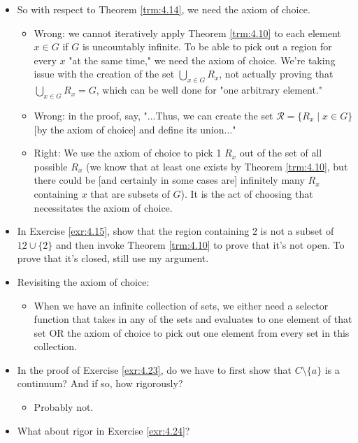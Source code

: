 \documentclass[titlepage]{report}
\begin{document}
\begin{itemize}
\begin{itemize}
    \end{itemize}
    \item So with respect to Theorem \ref{trm:4.14}, we need the axiom of choice.
    \begin{itemize}
        \item Wrong: we cannot iteratively apply Theorem \ref{trm:4.10} to each element $x\in G$ if $G$ is uncountably infinite. To be able to pick out a region for every $x$ "at the same time," we need the axiom of choice. We're taking issue with the creation of the set $\bigcup_{x\in G}R_x$, not actually proving that $\bigcup_{x\in G}R_x=G$, which can be well done for "one arbitrary element."
        \item Wrong: in the proof, say, "...Thus, we can create the set $\mathcal{R}=\{R_x\mid x\in G\}$ [by the axiom of choice] and define its union..."
        \item Right: We use the axiom of choice to pick 1 $R_x$ out of the set of all possible $R_x$ (we know that at least one exists by Theorem \ref{trm:4.10}, but there could be [and certainly in some cases are] infinitely many $R_x$ containing $x$ that are subsets of $G$). It is the act of choosing that necessitates the axiom of choice.
    \end{itemize}
    \item In Exercise \ref{exr:4.15}, show that the region containing 2 is not a subset of $\underline{12}\cup\{2\}$ and then invoke Theorem \ref{trm:4.10} to prove that it's not open. To prove that it's closed, still use my argument.
    \item {}Revisiting the axiom of choice:
    \begin{itemize}
        \item When we have an infinite collection of sets, we either need a selector function that takes in any of the sets and evaluates to one element of that set OR the axiom of choice to pick out one element from every set in this collection.
    \end{itemize}
    \item {}In the proof of Exercise \ref{exr:4.23}, do we have to first show that $C\setminus\{a\}$ is a continuum? And if so, how rigorously?
    \begin{itemize}
        \item Probably not.
    \end{itemize}
    \item What about rigor in Exercise \ref{exr:4.24}?
    \begin{itemize}

\end{itemize}
\end{itemize}
\end{document}
